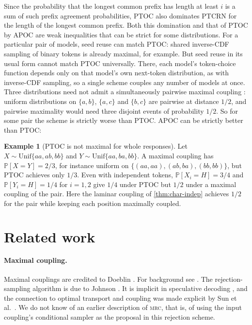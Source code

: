 \documentclass[11pt]{article}
\theoremstyle{definition}
\newtheorem{example}[theorem]{Example}
\newcommand{\MRC}{\textnormal{\textsc{mrc}}}
\renewcommand{\Pr}{\mathbb{P}}
\begin{document}
Since the probability that the longest common prefix has length at least $i$ is
a sum of such prefix agreement probabilities, PTOC also dominates PTCRN for the
length of the longest common prefix. Both this domination and that of PTOC by
APOC are weak inequalities that can be strict for some distributions. For a
particular pair of models, seed reuse can match PTOC: shared inverse-CDF
sampling of binary tokens is already maximal, for example. But seed reuse in
its usual form cannot match PTOC universally. There, each model's token-choice
function depends only on that model's own next-token distribution, as with
inverse-CDF sampling, so a single scheme couples any number of models at once.
Three distributions need not admit a simultaneously pairwise maximal coupling
\cite{angel2021pairwise}: uniform distributions on $\{a,b\}$, $\{a,c\}$ and
$\{b,c\}$ are pairwise at distance $1/2$, and pairwise maximality would need
three disjoint events of probability $1/2$. So for some pair the scheme is
strictly worse than PTOC. APOC can be strictly better than PTOC:

\begin{example}[PTOC is not maximal for whole responses]\label{ex:ptoc}
Let $X\sim\mathrm{Unif}\{aa,ab,bb\}$ and $Y\sim\mathrm{Unif}\{aa,ba,bb\}$. A
maximal coupling has $\Pr[X=Y]=2/3$, for instance uniform on
$\{(aa,aa),(ab,ba),(bb,bb)\}$, but PTOC achieves only $1/3$. Even with independent
tokens, $\Pr[X_i=H]=3/4$ and $\Pr[Y_i=H]=1/4$ for $i=1,2$ give $1/4$ under PTOC
but $1/2$ under a maximal coupling of the pair. Here the laminar coupling of
\cref{thm:char-indep} achieves $1/2$ for the pair while keeping each position
maximally coupled.
\end{example}

\section{Related work}\label{sec:related}

\paragraph{Maximal coupling.}
Maximal couplings are credited to Doeblin \cite{lindvall1991doeblin}. For
background see \cite{lindvall1992lectures,levin2009markov}. The
rejection-sampling algorithm is due to Johnson \cite{johnson1998coupling}. It
is implicit in speculative decoding \cite{leviathan2023fast,chen2023accelerating},
and the connection to optimal transport and coupling was made explicit by Sun
et al.~\cite{sun2023spectr}. We do not know of an earlier description of
\MRC{}, that is, of using the input coupling's conditional sampler as the
proposal in this rejection scheme.
\end{document}
